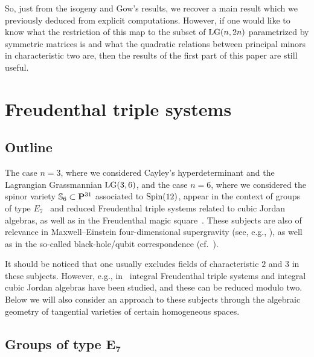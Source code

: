 \documentclass[pdftex]{sigma}
\newcommand{\PP}{{\bf P}}
\newcommand{\bS}{{\mathbb S}}
\numberwithin{equation}{section}
\begin{document}
\begin{Remark}
So, just from the isogeny and Gow's results, we recover a main result which we previously deduced from explicit computations. However, if one would like to know what the restriction of this map to the subset of ${\rm LG}(n,2n)$ parametrized by symmetric matrices is and what the quadratic relations between principal minors in characteristic two are, then the results of the first part of this paper are still useful.
\end{Remark}

\section{Freudenthal triple systems}

\subsection{Outline}
The case $n=3$, where we considered Cayley's hyperdeterminant and the Lagrangian Grassmannian ${\rm LG}(3,6)$, and the case $n=6$, where we considered the spinor variety $\bS_6\subset\PP^{31}$ associated to ${\rm Spin}(12)$, appear in the context of groups of type $E_7$~\cite{Brown} and reduced Freudenthal triple systems related to cubic Jordan algebras, as well as in the Freudenthal magic square~\cite{LM}. These subjects are also of relevance in Maxwell--Einstein four-dimensional supergravity (see, e.g., \cite{BFGM,BDFMR,CFMZ,FGK,FG,FM}), as well as in the so-called black-hole/qubit correspondence (cf.~\cite{BDDER,BDL,D,KL}).

It should be noticed that one usually excludes fields of characteristic $2$ and $3$ in these subjects. However, e.g., in~\cite{BDDR} integral Freudenthal triple systems and integral cubic Jordan algebras have been studied, and these can be reduced modulo two. Below we will also consider an approach to these subjects through the algebraic geometry of tangential varieties of certain homogeneous spaces.

\subsection[Groups of type $E_7$]{Groups of type $\boldsymbol{E_7}$}\label{jor}
\end{document}
